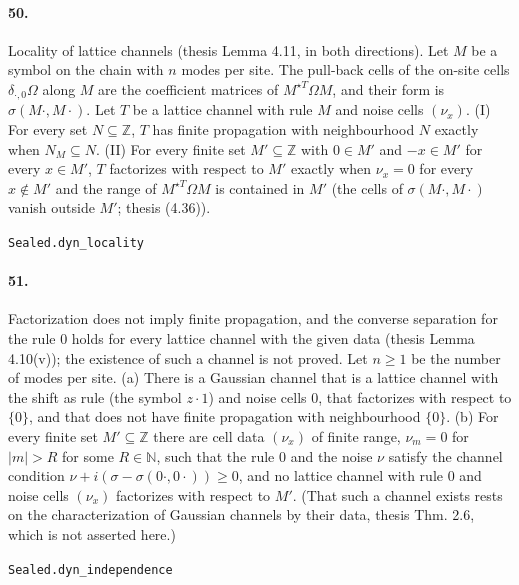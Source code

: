 \documentclass[11pt]{article}
\begin{document}
\paragraph{50.} Locality of lattice channels (thesis Lemma 4.11, in both directions). Let $M$ be a symbol on the chain with $n$ modes per site. The pull-back cells of the on-site cells $\delta_{\cdot,0}\Omega$ along $M$ are the coefficient matrices of $M^{\star T}\Omega M$, and their form is $\sigma(M\cdot, M\cdot)$. Let $T$ be a lattice channel with rule $M$ and noise cells $(\nu_x)$. (I) For every set $N \subseteq \mathbb Z$, $T$ has finite propagation with neighbourhood $N$ exactly when $N_M \subseteq N$. (II) For every finite set $M' \subseteq \mathbb Z$ with $0 \in M'$ and $-x \in M'$ for every $x \in M'$, $T$ factorizes with respect to $M'$ exactly when $\nu_x = 0$ for every $x \notin M'$ and the range of $M^{\star T}\Omega M$ is contained in $M'$ (the cells of $\sigma(M\cdot, M\cdot)$ vanish outside $M'$; thesis (4.36)).\par{\footnotesize\texttt{Sealed.dyn\_locality}}

\paragraph{51.} Factorization does not imply finite propagation, and the converse separation for the rule $0$ holds for every lattice channel with the given data (thesis Lemma 4.10(v)); the existence of such a channel is not proved. Let $n \ge 1$ be the number of modes per site. (a) There is a Gaussian channel that is a lattice channel with the shift as rule (the symbol $z \cdot 1$) and noise cells $0$, that factorizes with respect to $\{0\}$, and that does not have finite propagation with neighbourhood $\{0\}$. (b) For every finite set $M' \subseteq \mathbb Z$ there are cell data $(\nu_x)$ of finite range, $\nu_m = 0$ for $|m| > R$ for some $R \in \mathbb N$, such that the rule $0$ and the noise $\nu$ satisfy the channel condition $\nu + i(\sigma - \sigma(0\cdot, 0\cdot)) \ge 0$, and no lattice channel with rule $0$ and noise cells $(\nu_x)$ factorizes with respect to $M'$. (That such a channel exists rests on the characterization of Gaussian channels by their data, thesis Thm. 2.6, which is not asserted here.)\par{\footnotesize\texttt{Sealed.dyn\_independence}}
\end{document}
